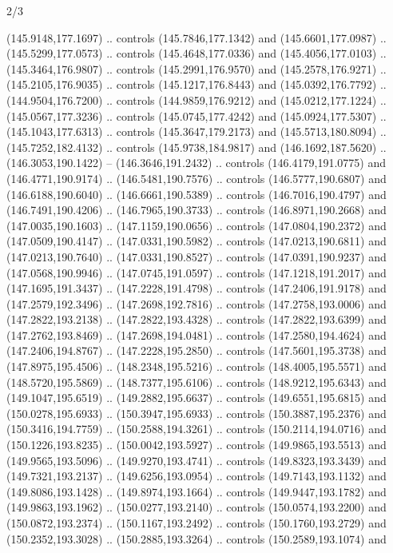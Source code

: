\begin{flagdescription}{2/3}
\begin{scope}[shift={(0.5\flaglength,0.5)},scale=\flagwidth/320]
\begin{scope}[y=0.8pt, x=0.8pt, yscale=-1,shift={(-118.3,-146)}]
  (145.9148,177.1697) .. controls (145.7846,177.1342) and (145.6601,177.0987) ..
  (145.5299,177.0573) .. controls (145.4648,177.0336) and (145.4056,177.0103) ..
  (145.3464,176.9807) .. controls (145.2991,176.9570) and (145.2578,176.9271) ..
  (145.2105,176.9035) .. controls (145.1217,176.8443) and (145.0392,176.7792) ..
  (144.9504,176.7200) .. controls (144.9859,176.9212) and (145.0212,177.1224) ..
  (145.0567,177.3236) .. controls (145.0745,177.4242) and (145.0924,177.5307) ..
  (145.1043,177.6313) .. controls (145.3647,179.2173) and (145.5713,180.8094) ..
  (145.7252,182.4132) .. controls (145.9738,184.9817) and (146.1692,187.5620) ..
  (146.3053,190.1422) -- (146.3646,191.2432) .. controls (146.4179,191.0775) and
  (146.4771,190.9174) .. (146.5481,190.7576) .. controls (146.5777,190.6807) and
  (146.6188,190.6040) .. (146.6661,190.5389) .. controls (146.7016,190.4797) and
  (146.7491,190.4206) .. (146.7965,190.3733) .. controls (146.8971,190.2668) and
  (147.0035,190.1603) .. (147.1159,190.0656) .. controls (147.0804,190.2372) and
  (147.0509,190.4147) .. (147.0331,190.5982) .. controls (147.0213,190.6811) and
  (147.0213,190.7640) .. (147.0331,190.8527) .. controls (147.0391,190.9237) and
  (147.0568,190.9946) .. (147.0745,191.0597) .. controls (147.1218,191.2017) and
  (147.1695,191.3437) .. (147.2228,191.4798) .. controls (147.2406,191.9178) and
  (147.2579,192.3496) .. (147.2698,192.7816) .. controls (147.2758,193.0006) and
  (147.2822,193.2138) .. (147.2822,193.4328) .. controls (147.2822,193.6399) and
  (147.2762,193.8469) .. (147.2698,194.0481) .. controls (147.2580,194.4624) and
  (147.2406,194.8767) .. (147.2228,195.2850) .. controls (147.5601,195.3738) and
  (147.8975,195.4506) .. (148.2348,195.5216) .. controls (148.4005,195.5571) and
  (148.5720,195.5869) .. (148.7377,195.6106) .. controls (148.9212,195.6343) and
  (149.1047,195.6519) .. (149.2882,195.6637) .. controls (149.6551,195.6815) and
  (150.0278,195.6933) .. (150.3947,195.6933) .. controls (150.3887,195.2376) and
  (150.3416,194.7759) .. (150.2588,194.3261) .. controls (150.2114,194.0716) and
  (150.1226,193.8235) .. (150.0042,193.5927) .. controls (149.9865,193.5513) and
  (149.9565,193.5096) .. (149.9270,193.4741) .. controls (149.8323,193.3439) and
  (149.7321,193.2137) .. (149.6256,193.0954) .. controls (149.7143,193.1132) and
  (149.8086,193.1428) .. (149.8974,193.1664) .. controls (149.9447,193.1782) and
  (149.9863,193.1962) .. (150.0277,193.2140) .. controls (150.0574,193.2200) and
  (150.0872,193.2374) .. (150.1167,193.2492) .. controls (150.1760,193.2729) and
  (150.2352,193.3028) .. (150.2885,193.3264) .. controls (150.2589,193.1074) and

\end{scope}
\end{scope}
\end{flagdescription}
